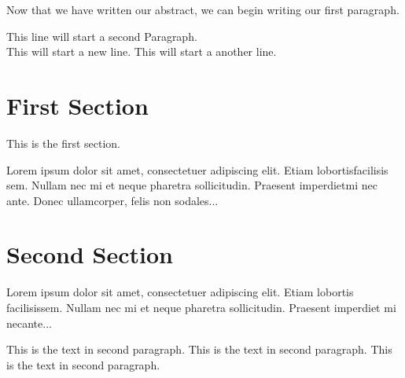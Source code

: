 \documentclass[12pt, letterpaper]{article}
\begin{document}
Now that we have written our abstract, we can begin writing our first paragraph.

This line will start a second Paragraph.
\\ This will start a new line.
\newline This will start a another line.



\section{First Section}
This is the first section.	%

Lorem ipsum dolor sit amet, consectetuer adipiscing elit. Etiam lobortisfacilisis sem. Nullam nec mi et neque pharetra sollicitudin. Praesent imperdietmi nec ante. Donec ullamcorper, felis non sodales...

\section{Second Section}
Lorem ipsum dolor sit amet, consectetuer adipiscing elit. Etiam lobortis facilisissem. Nullam nec mi et neque pharetra sollicitudin. Praesent imperdiet mi necante... \par
\setlength{\parindent}{10ex}	%
This is the text in second paragraph. This is the text in second 
paragraph. This is the text in second paragraph.
\end{document}
